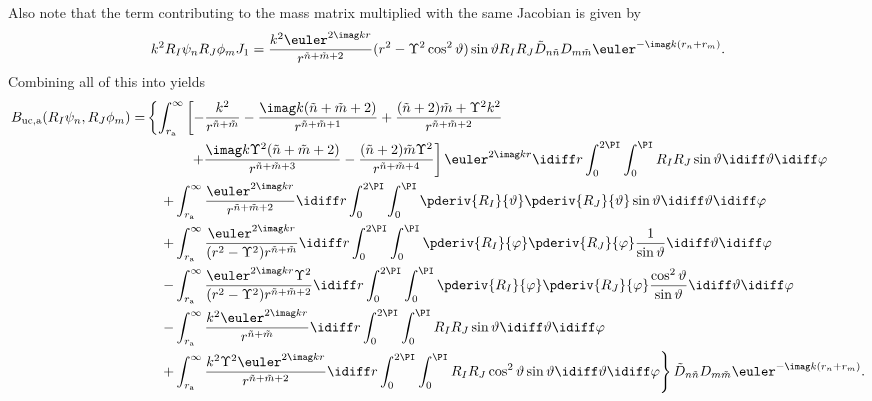 Also note that the term contributing to the mass matrix multiplied with the same Jacobian is given by
\begin{equation*}
	k^2R_I\psi_n R_J\phi_m J_1 = \frac{k^2\euler^{2\imag k r}}{r^{\tilde{n}+\tilde{m}+2}} (r^2-\Upsilon^2\cos^2\vartheta)\sin\vartheta R_I R_J\tilde{D}_{n\tilde{n}}D_{m\tilde{m}}\euler^{-\imag k (r_n+r_m)}.
\end{equation*}
Combining all of this into  yields
\begin{align*}
	B_{\mathrm{uc},\mathrm{a}}(R_I\psi_n,R_J\phi_m) =&\left\{\int_{r_{\mathrm{a}}}^{\infty}\left[-\frac{k^2}{r^{\tilde{n}+\tilde{m}}} - \frac{\imag k(\tilde{n}+\tilde{m}+2)}{r^{\tilde{n}+\tilde{m}+1}} +\frac{(\tilde{n}+2)\tilde{m}+\Upsilon^2k^2}{r^{\tilde{n}+\tilde{m}+2}}\right.\right.\\
	&\left.\left.\quad\qquad + \frac{\imag k \Upsilon^2 (\tilde{n}+\tilde{m}+2)}{r^{\tilde{n}+\tilde{m}+3}} - \frac{(\tilde{n}+2)\tilde{m}\Upsilon^2}{r^{\tilde{n}+\tilde{m}+4}}\right]\euler^{2\imag k r}\idiff r \int_0^{2\PI}\int_0^\PI R_I R_J\sin\vartheta\idiff\vartheta\idiff\varphi\right.\\
	&\left.\quad +\int_{r_{\mathrm{a}}}^{\infty}\frac{\euler^{2\imag k r}}{r^{\tilde{n}+\tilde{m}+2}}\idiff r\int_0^{2\PI}\int_0^\PI \pderiv{R_I}{\vartheta} \pderiv{R_J}{\vartheta}\sin\vartheta\idiff\vartheta\idiff\varphi\right.\\
	&\left.\quad +\int_{r_{\mathrm{a}}}^{\infty}\frac{\euler^{2\imag k r}}{(r^2-\Upsilon^2)r^{\tilde{n}+\tilde{m}}}\idiff r\int_0^{2\PI}\int_0^\PI \pderiv{R_I}{\varphi} \pderiv{R_J}{\varphi}\frac{1}{\sin\vartheta}\idiff\vartheta\idiff\varphi \right.\\
	&\left.\quad- \int_{r_{\mathrm{a}}}^{\infty}\frac{\euler^{2\imag k r}\Upsilon^2}{(r^2-\Upsilon^2)r^{\tilde{n}+\tilde{m}+2}}\idiff r\int_0^{2\PI}\int_0^\PI \pderiv{R_I}{\varphi} \pderiv{R_J}{\varphi}\frac{\cos^2\vartheta}{\sin\vartheta}\idiff\vartheta\idiff\varphi \right.\\
	&\left.\quad- \int_{r_{\mathrm{a}}}^{\infty}\frac{k^2\euler^{2\imag k r}}{r^{\tilde{n}+\tilde{m}}}\idiff r\int_0^{2\PI}\int_0^\PI R_I R_J\sin\vartheta\idiff\vartheta\idiff\varphi\right.\\
	&\left.\quad+ \int_{r_{\mathrm{a}}}^{\infty}\frac{k^2\Upsilon^2\euler^{2\imag k r}}{r^{\tilde{n}+\tilde{m}+2}}\idiff r\int_0^{2\PI}\int_0^\PI R_I R_J\cos^2\vartheta\sin\vartheta\idiff\vartheta\idiff\varphi\right\}\tilde{D}_{n\tilde{n}}D_{m\tilde{m}}\euler^{-\imag k (r_n+r_m)}.
\end{align*}
